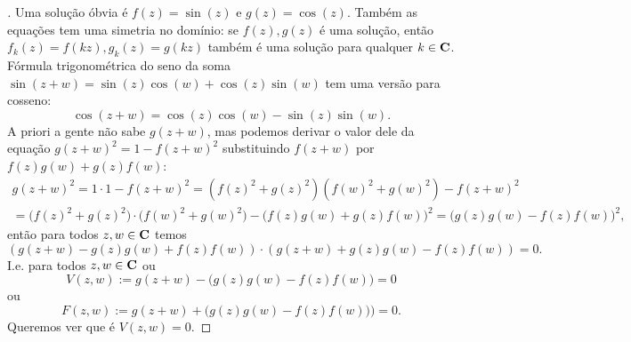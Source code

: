 \begin{proof}[]

Uma solução óbvia é $f(z) = \sin(z)$ e $g(z) =\cos(z)$.
Também as equações tem uma simetria no domínio:
se $f(z),g(z)$ é uma solução, então $f_k(z) = f(kz), g_k(z) = g(kz)$
também é uma solução para qualquer $k\in\mathbf{C}$.
Fórmula trigonométrica do seno da soma
$\sin(z+w) = \sin(z) \cos(w) + \cos(z) \sin(w)$
tem uma versão para cosseno:
\[ \cos(z+w) = \cos(z)\cos(w) - \sin(z)\sin(w). \]
A priori a gente não sabe $g(z+w)$, mas podemos derivar o valor dele
da equação $g(z+w)^2 = 1 - f(z+w)^2$ substituindo $f(z+w)$
por $f(z)g(w)+g(z)f(w)$:
\begin{multline*}
g(z+w)^2 = 1\cdot 1 - f(z+w)^2 = (f(z)^2+g(z)^2)(f(w)^2+g(w)^2) - f(z+w)^2
\\ = \big(f(z)^2+g(z)^2\big)\cdot\big(f(w)^2+g(w)^2\big) - \big(f(z)g(w)+g(z)f(w)\big)^2
   = \big(g(z)g(w)-f(z)f(w)\big)^2,
\end{multline*}
então para todos $z,w\in\mathbf{C}$ temos
\[ (g(z+w)-g(z)g(w)+f(z)f(w)) \cdot (g(z+w) + g(z)g(w)-f(z)f(w)) = 0. \]
I.e. para todos $z,w\in\mathbf{C}$ ou
\[ V(z,w) := g(z+w) - \big(g(z)g(w) - f(z)f(w)\big) = 0 \]
ou 
\[ F(z,w) := g(z+w) + \big(g(z)g(w)-f(z)f(w))\big) = 0. \]
Queremos ver que é $V(z,w)=0$.

\end{proof}
